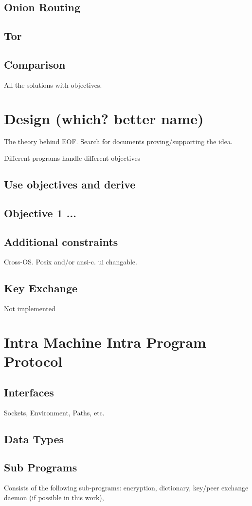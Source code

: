 \documentclass[12pt,a4paper]{article}
\begin{document}
\subsection{Onion Routing}
\subsection{Tor}
\subsection{Comparison}
All the solutions with objectives.

\section{Design (which? better name)}
The theory behind EOF.
Search for documents proving/supporting the idea.

Different programs handle different objectives
\subsection{Use objectives and derive}
\subsection{Objective 1 ...}
\subsection{Additional constraints}
Cross-OS. Posix and/or ansi-c. ui changable.
\subsection{Key Exchange}
Not implemented
\section{Intra Machine Intra Program Protocol}
\subsection{Interfaces}
Sockets, Environment, Paths, etc.
\subsection{Data Types}
\subsection{Sub Programs}
Consists of the following sub-programs:
encryption, dictionary, key/peer exchange daemon (if possible in this work),
\end{document}
